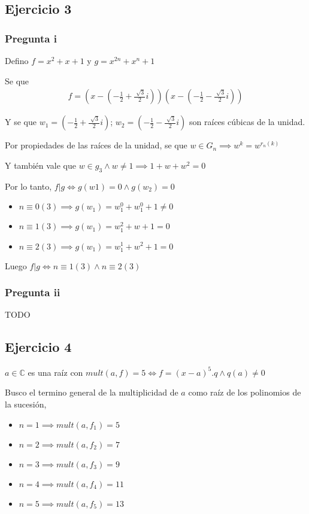 \subsection{Ejercicio 3}

\subsubsection{Pregunta i}

Defino $ f = x^2 + x + 1 $ y $ g = x^{2n} + x^n + 1 $

Se que
\begin{align*}
    f = \left( x - \left( -\frac{1}{2} + \frac{\sqrt[]{3}}{2}i \right) \right)\left( x - \left( -\frac{1}{2} - \frac{\sqrt[]{3}}{2}i \right) \right)
\end{align*}

Y se que $ w_1 = \left( -\frac{1}{2} + \frac{\sqrt[]{3}}{2}i \right) $; $ w_2 = \left( -\frac{1}{2} - \frac{\sqrt[]{3}}{2}i \right) $ son raíces cúbicas de la unidad.

Por propiedades de las raíces de la unidad, se que $ w \in G_n \implies w^k = w^{r_n(k)} $

Y también vale que $ w \in g_3 \wedge w \neq 1 \implies 1 + w + w^2 = 0 $

Por lo tanto, $ f|g \iff g(w1) = 0 \wedge g(w_2) = 0 $

\begin{itemize}
    \item $ n \equiv 0(3) \implies g(w_1) = w_1^0 + w_1^0 + 1 \neq 0 $
    \item $ n \equiv 1(3) \implies g(w_1) = w_1^2 + w + 1 = 0 $
    \item $ n \equiv 2(3) \implies g(w_1) = w_1^1 + w^2 + 1 = 0 $
\end{itemize}

Luego $ f|g \iff n \equiv 1(3) \wedge n \equiv 2(3) $

\subsubsection{Pregunta ii}
TODO

\subsection{Ejercicio 4}

$ a \in \mathbb{C} $ es una raíz con $ mult(a, f) = 5 \iff f = (x-a)^5 . q \wedge q(a) \neq 0 $

Busco el termino general de la multiplicidad de $a$ como raíz de los polinomios de la sucesión,
\begin{itemize}
    \item $ n = 1 \implies mult(a, f_1) = 5 $
    \item $ n = 2 \implies mult(a, f_2) = 7 $
    \item $ n = 3 \implies mult(a, f_3) = 9 $
    \item $ n = 4 \implies mult(a, f_4) = 11 $
    \item $ n = 5 \implies mult(a, f_5) = 13 $
\end{itemize}

